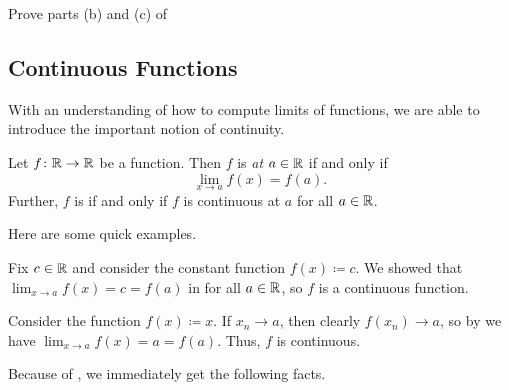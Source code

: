 \documentclass[../notes.tex]{subfiles}
\begin{document}
\begin{exe} \label{exe:finish-lim-is-linear}
    Prove parts (b) and (c) of 
\end{exe}

\subsection{Continuous Functions}

With an understanding of how to compute limits of functions, we are able to introduce the important notion of continuity.

\begin{definition}[continuous]
    Let $f\colon\mathbb R \to \mathbb R$ be a function. Then $f$ is \textit{ at $a\in\mathbb R$} if and only if
    \[\lim_{x\to a}f(x) = f(a).\]
    Further, $f$ is  if and only if $f$ is continuous at $a$ for all $a\in \mathbb R$. 
\end{definition}
Here are some quick examples.
\begin{example}
    Fix $c\in \mathbb R$ and consider the constant function $f(x)\coloneqq c$. We showed that $\lim_{x\to a}f(x)=c=f(a)$ in  for all $a\in \mathbb R$, so $f$ is a continuous function. 
\end{example}
\begin{example}
    Consider the function $f(x)\coloneqq x$. If $x_n\to a$, then clearly $f(x_n)\to a$, so by  we have $\lim_{x\to a}f(x) = a = f(a)$. Thus, $f$ is continuous.
\end{example}
Because of , we immediately get the following facts.
\end{document}
